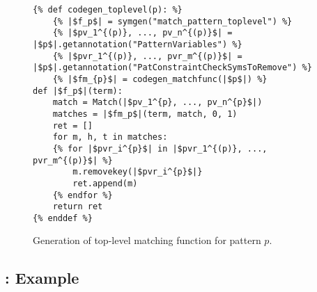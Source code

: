 \begin{figure}
\begin{verbatim}
{% def codegen_toplevel(p): %}
	{% |$f_p$| = symgen("match_pattern_toplevel") %}
	{% |$pv_1^{(p)}, ..., pv_n^{(p)}$| = |$p$|.getannotation("PatternVariables") %}
	{% |$pvr_1^{(p)}, ..., pvr_m^{(p)}$| = |$p$|.getannotation("PatConstraintCheckSymsToRemove") %}
	{% |$fm_{p}$| = codegen_matchfunc(|$p$|) %}
def |$f_p$|(term):
	match = Match(|$pv_1^{p}, ..., pv_n^{p}$|)
	matches = |$fm_p$|(term, match, 0, 1)
	ret = []
	for m, h, t in matches:
	{% for |$pvr_i^{p}$| in |$pvr_1^{(p)}, ..., pvr_m^{(p)}$| %}
		m.removekey(|$pvr_i^{p}$|}
		ret.append(m)
	{% endfor %}
	return ret
{% enddef %}
\end{verbatim} 
\caption{Generation of top-level matching function for pattern $p$.}
\label{pat-toplevel}
\end{figure}

\subsection{\RepeatNoArg: Example}

